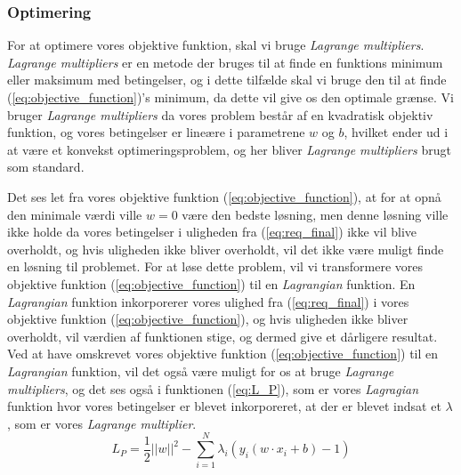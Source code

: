\documentclass{article}
\begin{document}
\subsubsection{Optimering}
For at optimere vores objektive funktion, skal vi bruge \textit{Lagrange multipliers}. \textit{Lagrange multipliers} er en metode der bruges til at finde en funktions minimum eller maksimum med betingelser, og i dette tilfælde skal vi bruge den til at finde (\ref{eq:objective_function})'s minimum, da dette vil give os den optimale grænse. Vi bruger \textit{Lagrange multipliers} da vores problem består af en kvadratisk objektiv funktion, og vores betingelser er lineære i parametrene $w$ og $b$, hvilket ender ud i at være et konvekst optimeringsproblem, og her bliver \textit{Lagrange multipliers} brugt som standard.

Det ses let fra vores objektive funktion (\ref{eq:objective_function}), at for at opnå den minimale værdi ville $w = 0$ være den bedste løsning, men denne løsning ville ikke holde da vores betingelser i uligheden fra (\ref{eq:req_final}) ikke vil blive overholdt, og hvis uligheden ikke bliver overholdt, vil det ikke være muligt finde en løsning til problemet. For at løse dette problem, vil vi transformere vores objektive funktion (\ref{eq:objective_function}) til en \textit{Lagrangian} funktion. En \textit{Lagrangian} funktion inkorporerer vores ulighed fra (\ref{eq:req_final}) i vores objektive funktion (\ref{eq:objective_function}), og hvis uligheden ikke bliver overholdt, vil værdien af funktionen stige, og dermed give et dårligere resultat. Ved at have omskrevet vores objektive funktion (\ref{eq:objective_function}) til en \textit{Lagrangian} funktion, vil det også være muligt for os at bruge \textit{Lagrange multipliers}, og det ses også i funktionen (\ref{eq:L_P}), som er vores \textit{Lagragian} funktion hvor vores betingelser er blevet inkorporeret, at der er blevet indsat et $\lambda$, som er vores \textit{Lagrange multiplier}.
\begin{equation}
\label{eq:L_P}
L_P = \frac{1}{2}||w||^2 - \sum\limits_{i=1}^N \lambda_i (y_i(w \cdot x_i + b) - 1)
\end{equation}
\end{document}
